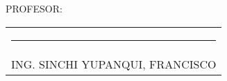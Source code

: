\documentclass[a4paper,12pt]{report}
\begin{document}

{\large PROFESOR:} \\[2cm]
\begin{center}
\begin{tabular}{c}
\rule[3pt]{4.8in}{1pt}\\[1pt]
ING. SINCHI YUPANQUI, FRANCISCO 
\end{tabular}
\end{center}
\vfill
\newpage
\tableofcontents
\newpage
{} %
\setcounter{page}{1}  %
\end{document}
